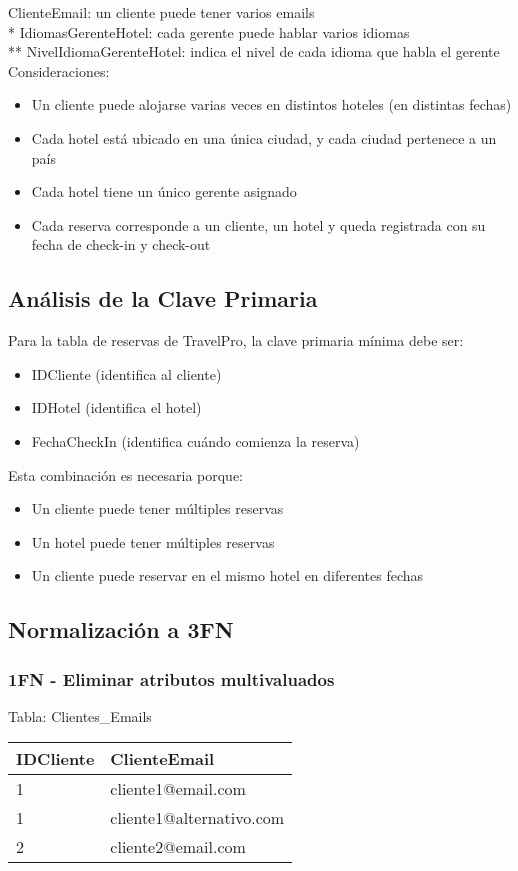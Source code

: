 \documentclass[12pt]{article}
\begin{document}
\vspace{2em}

{\small * ClienteEmail: un cliente puede tener varios emails} \\
{\small ** IdiomasGerenteHotel: cada gerente puede hablar varios idiomas} \\
{\small *** NivelIdiomaGerenteHotel: indica el nivel de cada idioma que habla el gerente} \\

Consideraciones:
\begin{itemize}
    \item Un cliente puede alojarse varias veces en distintos hoteles (en distintas fechas)
    \item Cada hotel está ubicado en una única ciudad, y cada ciudad pertenece a un país
    \item Cada hotel tiene un único gerente asignado
    \item Cada reserva corresponde a un cliente, un hotel y queda registrada con su fecha de check-in y check-out
\end{itemize}

\subsection{Análisis de la Clave Primaria}
Para la tabla de reservas de TravelPro, la clave primaria mínima debe ser:
\begin{itemize}
    \item IDCliente (identifica al cliente)
    \item IDHotel (identifica el hotel)
    \item FechaCheckIn (identifica cuándo comienza la reserva)
\end{itemize}

Esta combinación es necesaria porque:
\begin{itemize}
    \item Un cliente puede tener múltiples reservas
    \item Un hotel puede tener múltiples reservas
    \item Un cliente puede reservar en el mismo hotel en diferentes fechas
\end{itemize}

\subsection{Normalización a 3FN}

\subsubsection{1FN - Eliminar atributos multivaluados}
Tabla: Clientes\_Emails
\begin{center}
\begin{tabular}{ll}
\toprule
IDCliente & ClienteEmail \\
\midrule
1 & cliente1@email.com \\
1 & cliente1@alternativo.com \\
2 & cliente2@email.com \\
\bottomrule
\end{tabular}
\end{center}
\end{document}

